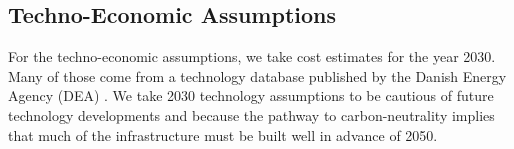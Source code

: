 











\begin{landscape}



\section{Techno-Economic Assumptions}
\label{sec:si:costs}

For the techno-economic assumptions, we take cost estimates for the year 2030.
Many of those come from a technology database published by the Danish Energy
Agency (DEA) \citeS{}. We take 2030 technology assumptions to be cautious of
future technology developments and because the pathway to carbon-neutrality
implies that much of the infrastructure must be built well in advance of 2050.

\begin{small}

\end{small}

\end{landscape}

\restoregeometry